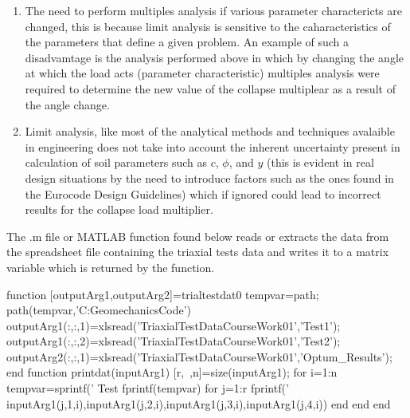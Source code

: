 \documentclass{article}
\begin{document}
\begin{enumerate}
\setlength{\itemsep}{-1ex}
   \item{\begin{flushleft} The need to perform multiples analysis if various parameter charactericts are changed, this is because limit analysis is sensitive to the caharacteristics of the parameters that define a given problem. An example of such a disadvamtage is the analysis performed above in which by changing the angle at which the load acts (parameter characteristic) multiples analysis were required to determine the new value of the collapse multiplear as a result of the angle change. \end{flushleft}}
   \item{\begin{flushleft} Limit analysis, like most of the analytical methods and techniques avalaible in engineering does not take into account the inherent uncertainty present in calculation of soil parameters such as $c$, $\phi$, and $y$ (this is evident in real design situations by the need to introduce factors such as the ones found in the Eurocode Design Guidelines) which if ignored could lead to incorrect results for the collapse load multiplier. \end{flushleft}}
\end{enumerate}


\label{H_1E1657B1}

\begin{par}
\begin{flushleft}
The .m file or MATLAB function found below reads or extracts the data from the spreadsheet file containing the triaxial tests data and writes it to a matrix variable which is returned by the function.
\end{flushleft}
\end{par}

\begin{matlabcode}
function [outputArg1,outputArg2]=trialtestdat0
tempvar=path;
path(tempvar,'C:\Users\rodin\OneDrive\Documents\Advanced Geomechanics\Matlab Code')
outputArg1(:,:,1)=xlsread('TriaxialTestDataCourseWork01','Test1');
outputArg1(:,:,2)=xlsread('TriaxialTestDataCourseWork01','Test2');
outputArg2(:,:,1)=xlsread('TriaxialTestDataCourseWork01','Optum_Results');
end
function printdat(inputArg1)
[r,~,n]=size(inputArg1);
for i=1:n
    tempvar=sprintf('             Test %
    fprintf(tempvar)
    for j=1:r
        fprintf('%
        inputArg1(j,1,i),inputArg1(j,2,i),inputArg1(j,3,i),inputArg1(j,4,i))
    end
end
end
\end{matlabcode}
\end{document}
